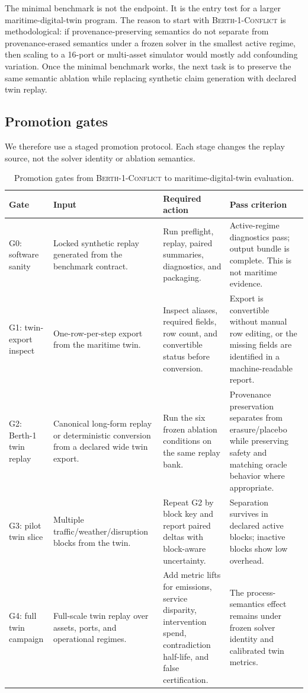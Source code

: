 \documentclass[11pt]{article}
\newcommand{\1}{\mathbf{1}}
\theoremstyle{definition}
\theoremstyle{plain}
\theoremstyle{remark}
\begin{document}
The minimal benchmark is not the endpoint. It is the entry test for a larger maritime-digital-twin program. The reason to start with \textsc{Berth-1-Conflict} is methodological: if provenance-preserving semantics do not separate from provenance-erased semantics under a frozen solver in the smallest active regime, then scaling to a 16-port or multi-asset simulator would mostly add confounding variation. Once the minimal benchmark works, the next task is to preserve the same semantic ablation while replacing synthetic claim generation with declared twin replay.

\subsection{Promotion gates}

We therefore use a staged promotion protocol. Each stage changes the replay source, not the solver identity or ablation semantics.

\begin{table}[H]
\centering
\caption{Promotion gates from \textsc{Berth-1-Conflict} to maritime-digital-twin evaluation.}
\label{tab:promotion-gates}
\small
\begin{tabularx}{\textwidth}{@{}L{0.09\textwidth}L{0.20\textwidth}Y Y@{}}
\toprule
Gate & Input & Required action & Pass criterion \\
\midrule
G0: software sanity & Locked synthetic replay generated from the benchmark contract. & Run preflight, replay, paired summaries, diagnostics, and packaging. & Active-regime diagnostics pass; output bundle is complete. This is not maritime evidence. \\
G1: twin-export inspect & One-row-per-step export from the maritime twin. & Inspect aliases, required fields, row count, and convertible status before conversion. & Export is convertible without manual row editing, or the missing fields are identified in a machine-readable report. \\
G2: Berth-1 twin replay & Canonical long-form replay or deterministic conversion from a declared wide twin export. & Run the six frozen ablation conditions on the same replay bank. & Provenance preservation separates from erasure/placebo while preserving safety and matching oracle behavior where appropriate. \\
G3: pilot twin slice & Multiple traffic/weather/disruption blocks from the twin. & Repeat G2 by block key and report paired deltas with block-aware uncertainty. & Separation survives in declared active blocks; inactive blocks show low overhead. \\
G4: full twin campaign & Full-scale twin replay over assets, ports, and operational regimes. & Add metric lifts for emissions, service disparity, intervention spend, contradiction half-life, and false certification. & The process-semantics effect remains under frozen solver identity and calibrated twin metrics. \\
\bottomrule
\end{tabularx}
\end{table}
\end{document}

